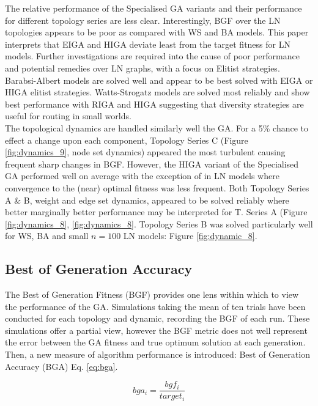 \documentclass[
	a4paper, %
	10pt, %
	unnumberedsections, %
	twoside, %
]{LTJournalArticle}
\begin{document}
The relative performance of the Specialised GA variants and their performance for different topology series are less clear. Interestingly, BGF over the LN topologies appears to be poor as compared with WS and BA models. This paper interprets that EIGA and HIGA deviate least from the target fitness for LN models. Further investigations are required into the cause of poor performance and potential remedies over LN graphs, with a focus on Elitist strategies. \\

Barabsi-Albert models are solved well and appear to be best solved with EIGA or HIGA elitist strategies. Watts-Strogatz models are solved most reliably and show best performance with RIGA and HIGA suggesting that diversity strategies are useful for routing in small worlds.\\

The topological dynamics are handled similarly well the GA. For a 5\% chance to effect a change upon each component, Topology Series C (Figure \ref{fig:dynamics_9}, node set dynamics) appeared the most turbulent causing frequent sharp changes in BGF. However, the HIGA variant of the Specialised GA performed well on average with the exception of in LN models where convergence to the (near) optimal fitness was less frequent. Both Topology Series A \& B, weight and edge set dynamics, appeared to be solved reliably where better marginally better performance may be interpreted for T. Series A (Figure \ref{fig:dynamics_8}, \ref{fig:dynamics_8}. Topology Series B was solved particularly well for WS, BA and small \(n = 100\) LN models: Figure \ref{fig:dynamic_8}. 

\subsection{Best of Generation Accuracy} 

The Best of Generation Fitness (BGF) provides one lens within which to view the performance of the GA.  Simulations taking the mean of ten trials have been conducted for each topology and dynamic, recording the BGF of each run. These simulations offer a partial view, however the BGF metric does not well represent the error between the GA fitness and true optimum solution at each generation. Then, a new measure of algorithm performance is introduced: Best of Generation Accuracy (BGA) Eq. \ref{eq:bga}. 

\begin{equation}
	bga_{i} = \frac{bgf_{i}}{target_{i}}
	\label{eq:bga}
\end{equation}
\end{document}
